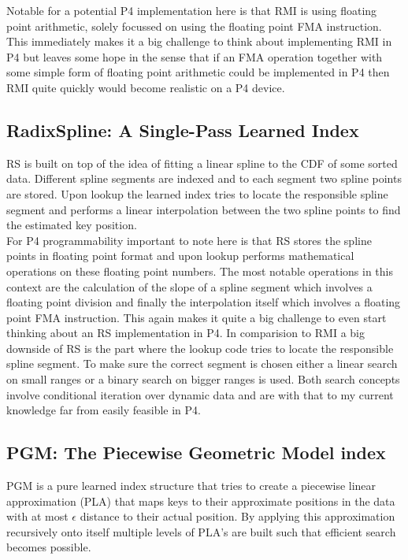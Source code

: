 Notable for a potential P4 implementation here is that RMI is using floating point arithmetic, solely focussed on using the floating point FMA instruction. This immediately makes it a big challenge to think about implementing RMI in P4 but leaves some hope in the sense that if an FMA operation together with some simple form of floating point arithmetic could be implemented in P4 then RMI quite quickly would become realistic on a P4 device.

\subsection{RadixSpline: A Single-Pass Learned Index}
RS \cite{radixspline} is built on top of the idea of fitting a linear spline to the CDF of some sorted data. Different spline segments are indexed and to each segment two spline points are stored. Upon lookup the learned index tries to locate the responsible spline segment and performs a linear interpolation between the two spline points to find the estimated key position.\\

For P4 programmability important to note here is that RS stores the spline points in floating point format and upon lookup performs mathematical operations on these floating point numbers. The most notable operations in this context are the calculation of the slope of a spline segment which involves a floating point division and finally the interpolation itself which involves a floating point FMA instruction. This again makes it quite a big challenge to even start thinking about an RS implementation in P4. In comparision to RMI a big downside of RS is the part where the lookup code tries to locate the responsible spline segment. To make sure the correct segment is chosen either a linear search on small ranges or a binary search on bigger ranges is used. Both search concepts involve conditional iteration over dynamic data and are with that to my current knowledge far from easily feasible in P4.

\subsection{PGM: The Piecewise Geometric Model index}
PGM \cite{pgm} is a pure learned index structure that tries to create a piecewise linear approximation (PLA) that maps keys to their approximate positions in the data with at most $\epsilon$ distance to their actual position. By applying this approximation recursively onto itself multiple levels of PLA's are built such that efficient search becomes possible.\\

